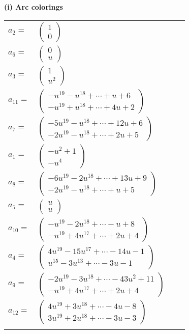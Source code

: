 \documentclass[1p]{elsarticle_modified}
\theoremstyle{definition}
\begin{document}
\flushleft \textbf{(i) Arc colorings}\\
\begin{tabular}{m{7pt} m{180pt} m{7pt} m{180pt} }
\flushright $a_{2}=$&$\begin{pmatrix}1\\0\end{pmatrix}$ \\
\flushright $a_{6}=$&$\begin{pmatrix}0\\u\end{pmatrix}$ \\
\flushright $a_{3}=$&$\begin{pmatrix}1\\u^2\end{pmatrix}$ \\
\flushright $a_{11}=$&$\begin{pmatrix}- u^{19}- u^{18}+\cdots+u+6\\- u^{19}+u^{18}+\cdots+4 u+2\end{pmatrix}$ \\
\flushright $a_{7}=$&$\begin{pmatrix}-5 u^{19}- u^{18}+\cdots+12 u+6\\-2 u^{19}- u^{18}+\cdots+2 u+5\end{pmatrix}$ \\
\flushright $a_{1}=$&$\begin{pmatrix}- u^2+1\\- u^4\end{pmatrix}$ \\
\flushright $a_{8}=$&$\begin{pmatrix}-6 u^{19}-2 u^{18}+\cdots+13 u+9\\-2 u^{19}- u^{18}+\cdots+u+5\end{pmatrix}$ \\
\flushright $a_{5}=$&$\begin{pmatrix}u\\u\end{pmatrix}$ \\
\flushright $a_{10}=$&$\begin{pmatrix}- u^{19}-2 u^{18}+\cdots- u+8\\- u^{19}+4 u^{17}+\cdots+2 u+4\end{pmatrix}$ \\
\flushright $a_{4}=$&$\begin{pmatrix}4 u^{19}-15 u^{17}+\cdots-14 u-1\\u^{15}-3 u^{13}+\cdots-3 u-1\end{pmatrix}$ \\
\flushright $a_{9}=$&$\begin{pmatrix}-2 u^{19}-3 u^{18}+\cdots-43 u^2+11\\- u^{19}+4 u^{17}+\cdots+2 u+4\end{pmatrix}$ \\
\flushright $a_{12}=$&$\begin{pmatrix}4 u^{19}+3 u^{18}+\cdots-4 u-8\\3 u^{19}+2 u^{18}+\cdots-3 u-3\end{pmatrix}$\\&\end{tabular}
\end{document}
